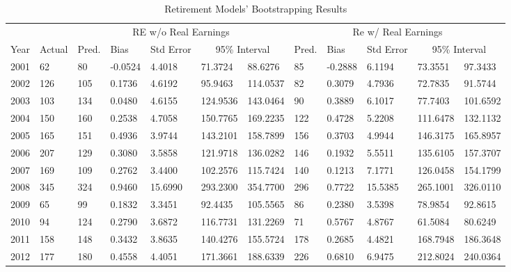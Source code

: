 \begin{table}[]
	\scriptsize
	\centering
	\caption{Retirement Models' Bootstrapping Results}
	\label{tab:bootre}
	\begin{tabular}{llllllllllll}
		\toprule
		&        & \multicolumn{5}{c}{RE w/o Real Earnings}                                 & \multicolumn{5}{c}{Re w/ Real Earnings}                                   \\ 
		Year & Actual & Pred.& Bias    & Std Error & \multicolumn{2}{c}{95\% Interval }          & Pred. & Bias    & Std Error & \multicolumn{2}{c}{95\% Interval }         \\ \midrule
		2001 & 62     & 80                      & -0.0524 & 4.4018    & 71.3724       & 88.6276  & 85                       & -0.2888 & 6.1194    & 73.3551       & 97.3433  \\ 
		2002 & 126    & 105                     & 0.1736  & 4.6192    & 95.9463       & 114.0537 & 82                       & 0.3079  & 4.7936    & 72.7835       & 91.5744  \\
		2003 & 103    & 134                     & 0.0480  & 4.6155    & 124.9536      & 143.0464 & 90                       & 0.3889  & 6.1017    & 77.7403       & 101.6592 \\
		2004 & 150    & 160                     & 0.2538  & 4.7058    & 150.7765      & 169.2235 & 122                      & 0.4728  & 5.2208    & 111.6478      & 132.1132 \\
		2005 & 165    & 151                     & 0.4936  & 3.9744    & 143.2101      & 158.7899 & 156                      & 0.3703  & 4.9944    & 146.3175      & 165.8957 \\
		2006 & 207    & 129                     & 0.3080  & 3.5858    & 121.9718      & 136.0282 & 146                      & 0.1932  & 5.5511    & 135.6105      & 157.3707 \\
		2007 & 169    & 109                     & 0.2762  & 3.4400    & 102.2576      & 115.7424 & 140                      & 0.1213  & 7.1771    & 126.0458      & 154.1799 \\
		2008 & 345    & 324                     & 0.9460  & 15.6990   & 293.2300      & 354.7700 & 296                      & 0.7722  & 15.5385   & 265.1001      & 326.0110 \\
		2009 & 65     & 99                      & 0.1832  & 3.3451    & 92.4435       & 105.5565 & 86                       & 0.2380  & 3.5398    & 78.9854       & 92.8615  \\
		2010 & 94     & 124                     & 0.2790  & 3.6872    & 116.7731      & 131.2269 & 71                       & 0.5767  & 4.8767    & 61.5084       & 80.6249  \\
		2011 & 158    & 148                     & 0.3432  & 3.8635    & 140.4276      & 155.5724 & 178                      & 0.2685  & 4.4821    & 168.7948      & 186.3648 \\ 
		2012 & 177    & 180                     & 0.4558  & 4.4051    & 171.3661      & 188.6339 & 226                      & 0.6810  & 6.9475    & 212.8024      & 240.0364 \\ \bottomrule
	\end{tabular}
\end{table}
